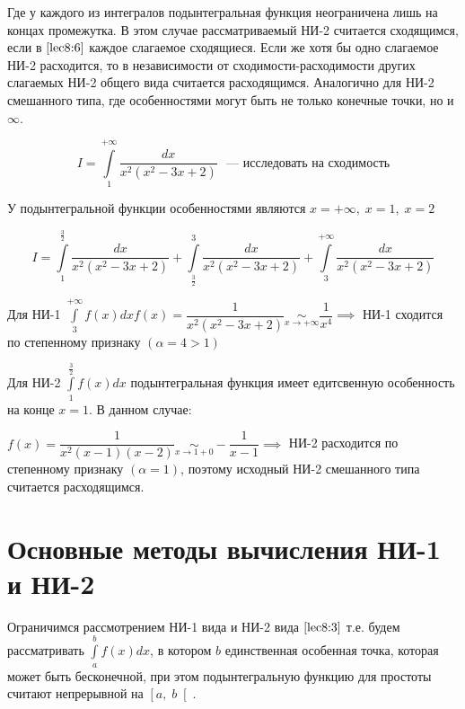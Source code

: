 \documentclass[../../main.tex]{subfiles}
\begin{document}
Где у каждого из интегралов подынтегральная функция неограничена лишь на концах промежутка. В этом случае рассматриваемый НИ-2 считается сходящимся, если в $\eqref{lec8:6}$ каждое слагаемое сходящиеся. Если же хотя бы одно слагаемое НИ-2 расходится, то в независимости от сходимости-расходимости других слагаемых НИ-2 общего вида считается расходящимся. Аналогично для НИ-2 смешанного типа, где особенностями могут быть не только конечные точки, но и $\infty$.

\begin{exmp}
\[I = \int\limits_{1}^{+\infty}\dfrac{dx}{x^2(x^2 - 3x + 2)} \text{ ~--- исследовать на сходимость} \]

У подынтегральной функции особенностями являются $x = +\infty,\; x = 1,\; x = 2$

\[I = \int\limits_{1}^{\frac{3}{2}}\dfrac{dx}{x^2(x^2 - 3x +2 )} + \int\limits_{\frac{3}{2}}^{3}\dfrac{dx}{x^2(x^2 - 3x +2 )} + \int\limits_{3}^{+\infty}\dfrac{dx}{x^2(x^2 - 3x +2 )}\]

Для НИ-1 $\displaystyle\int\limits_{3}^{+\infty}f(x)dx f(x) = \dfrac{1}{x^2(x^2 -3x + 2)} \underset{x \to +\infty} \sim \dfrac{1}{x^4} \implies$ НИ-1 сходится по степенному признаку $\left(\alpha = 4 > 1\right)$

Для НИ-2 $\displaystyle\int\limits_{1}^{\frac{3}{2}}f(x)dx$ подынтегральная функция имеет едитсвенную особенность на конце $x = 1$. В данном случае:

$f(x) = \dfrac{1}{x^2(x-1)(x-2)} \underset{x \to 1 + 0}\sim -\dfrac{1}{x - 1} \implies$ НИ-2 расходится по степенному признаку $\left(\alpha = 1\right)$, поэтому исходный НИ-2 смешанного типа считается расходящимся. 
\end{exmp}

\section{Основные методы вычисления НИ-1 и НИ-2}

Ограничимся рассмотрением НИ-1 вида и НИ-2 вида $\eqref{lec8:3}$ т.е. будем рассматривать $\displaystyle\int\limits_{a}^{b}f(x)dx$, в котором $b$ единственная особенная точка, которая может быть бесконечной, при этом подынтегральную функцию для простоты считают непрерывной на $\left[a,\; b\right[$. 
\end{document}
